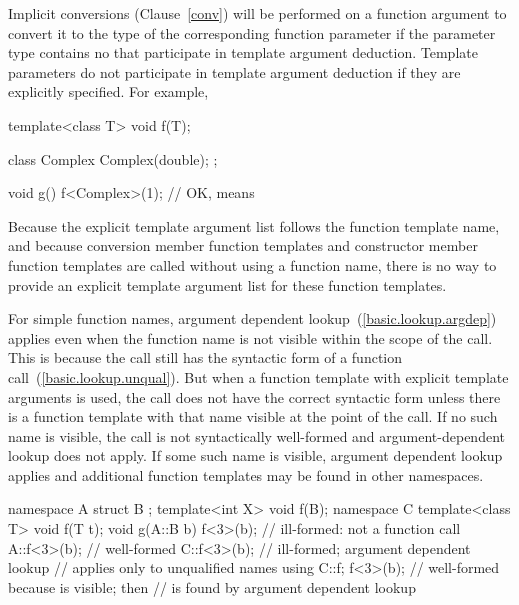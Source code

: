 \pnum
Implicit conversions (Clause~\ref{conv}) will be performed on a function argument
to convert it to the type of the corresponding function parameter if
the parameter type contains no
that participate in template argument deduction.
\enternote
Template parameters do not participate in template argument deduction if
they are explicitly specified.
For example,

\begin{codeblock}
template<class T> void f(T);

class Complex {
  Complex(double);
};

void g() {
  f<Complex>(1);                // OK, means 
}
\end{codeblock}
\exitnote

\pnum
\enternote
Because the explicit template argument list follows the function
template name, and because conversion member function templates and
constructor member function templates are called without using a
function name, there is no way to provide an explicit template
argument list for these function templates.
\exitnote

\pnum
\enternote
For simple function names, argument dependent lookup~(\ref{basic.lookup.argdep})
applies even when the function name is not visible within the scope of the call.
This is because the call still has the syntactic form of a function call~(\ref{basic.lookup.unqual}).
But when a function template with explicit template arguments is used,
the call does not have the correct syntactic form unless there is a function
template with that name visible at the point of the call.
If no such name is visible,
the call is not syntactically well-formed and argument-dependent lookup
does not apply.
If some such name is visible,
argument dependent lookup applies and additional function templates
may be found in other namespaces.
\enterexample

\begin{codeblock}
namespace A {
  struct B { };
  template<int X> void f(B);
}
namespace C {
  template<class T> void f(T t);
}
void g(A::B b) {
  f<3>(b);                      // ill-formed: not a function call
  A::f<3>(b);                   // well-formed
  C::f<3>(b);                   // ill-formed; argument dependent lookup
                                // applies only to unqualified names
  using C::f;
  f<3>(b);                      // well-formed because  is visible; then
                                //  is found by argument dependent lookup
}
\end{codeblock}
\exitexample
\exitnote

